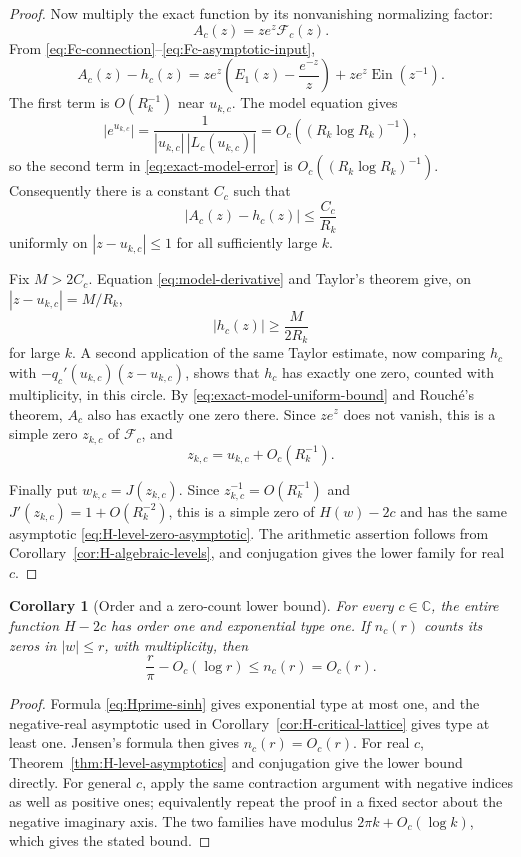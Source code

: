\documentclass[11pt]{article}
\newtheorem{corollary}[theorem]{Corollary}
\theoremstyle{definition}
\theoremstyle{remark}
\newcommand{\C}{\mathbb C}
\newcommand{\Ein}{\operatorname{Ein}}
\begin{document}
\begin{proof}
Now multiply the exact function by its nonvanishing normalizing factor:
\[
 A_c(z)=ze^z\mathcal F_c(z).
\]
From \eqref{eq:Fc-connection}--\eqref{eq:Fc-asymptotic-input},
\begin{equation}\label{eq:exact-model-error}
 A_c(z)-h_c(z)
 =ze^z\left(E_1(z)-\frac{e^{-z}}z\right)
  +ze^z\Ein(z^{-1}).
\end{equation}
The first term is $O(R_k^{-1})$ near $u_{k,c}$.  The model equation gives
\[
 |e^{u_{k,c}}|
 =\frac1{|u_{k,c}|\,|L_c(u_{k,c})|}
 =O_c((R_k\log R_k)^{-1}),
\]
so the second term in \eqref{eq:exact-model-error} is
$O_c((R_k\log R_k)^{-1})$.  Consequently there is a constant $C_c$ such
that
\begin{equation}\label{eq:exact-model-uniform-bound}
 |A_c(z)-h_c(z)|\leq \frac{C_c}{R_k}
\end{equation}
uniformly on $|z-u_{k,c}|\leq1$ for all sufficiently large $k$.

Fix $M>2C_c$.  Equation \eqref{eq:model-derivative} and Taylor's theorem
give, on $|z-u_{k,c}|=M/R_k$,
\[
 |h_c(z)|\geq\frac{M}{2R_k}
\]
for large $k$.  A second application of the same Taylor estimate, now
comparing $h_c$ with
$-q_c'(u_{k,c})(z-u_{k,c})$, shows that $h_c$ has exactly one zero, counted
with multiplicity, in this circle.  By
\eqref{eq:exact-model-uniform-bound} and Rouch\'e's theorem, $A_c$ also has
exactly one zero there.  Since $ze^z$ does not vanish, this is a simple zero
$z_{k,c}$ of $\mathcal F_c$, and
\[
 z_{k,c}=u_{k,c}+O_c(R_k^{-1}).
\]

Finally put $w_{k,c}=J(z_{k,c})$.  Since
$z_{k,c}^{-1}=O(R_k^{-1})$ and $J'(z_{k,c})=1+O(R_k^{-2})$, this is a
simple zero of $H(w)-2c$ and has the same asymptotic
\eqref{eq:H-level-zero-asymptotic}.  The arithmetic assertion follows from
Corollary~\ref{cor:H-algebraic-levels}, and conjugation gives the lower
family for real $c$.
\end{proof}

\begin{corollary}[Order and a zero-count lower bound]
\label{cor:H-order-zero-count}
For every $c\in\C$, the entire function $H-2c$ has order one and
exponential type one.  If $n_c(r)$ counts its zeros in $|w|\leq r$, with
multiplicity, then
\[
 \frac{r}{\pi}-O_c(\log r)\leq n_c(r)=O_c(r).
\]
\end{corollary}

\begin{proof}
Formula \eqref{eq:Hprime-sinh} gives exponential type at most one, and the
negative-real asymptotic used in Corollary~\ref{cor:H-critical-lattice}
gives type at least one.  Jensen's formula then gives $n_c(r)=O_c(r)$.
For real $c$, Theorem~\ref{thm:H-level-asymptotics} and conjugation give the
lower bound directly.  For general $c$, apply the same contraction argument
with negative indices as well as positive ones; equivalently repeat the
proof in a fixed sector about the negative imaginary axis.  The two
families have modulus $2\pi k+O_c(\log k)$, which gives the stated bound.
\end{proof}
\end{document}
